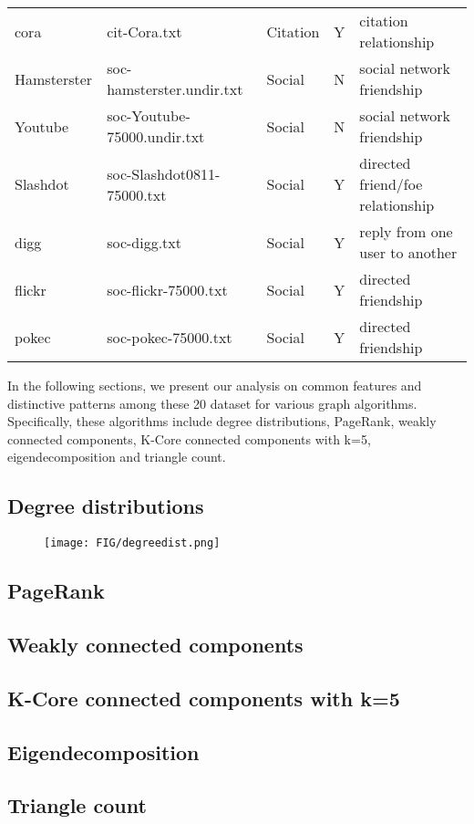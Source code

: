 \begin{table}[h]
\begin{tabular}{lllll}
cora           & cit-Cora.txt                 & Citation      & Y        & citation relationship                  \\
Hamsterster    & soc-hamsterster.undir.txt    & Social        & N        & social network friendship              \\
Youtube        & soc-Youtube-75000.undir.txt  & Social        & N        & social network friendship              \\
Slashdot       & soc-Slashdot0811-75000.txt   & Social        & Y        & directed friend/foe relationship       \\
digg           & soc-digg.txt                 & Social        & Y        & reply from one user to another         \\
flickr         & soc-flickr-75000.txt         & Social        & Y        & directed friendship                    \\
pokec          & soc-pokec-75000.txt          & Social        & Y        & directed friendship                                       \\ \hline
\end{tabular}
\end{table}

In the following sections, we present our analysis on common features and distinctive patterns among these 20 dataset for various graph algorithms. Specifically, these algorithms include degree distributions, PageRank, weakly connected components, K-Core connected components with k=5, eigendecomposition and triangle count.

\subsection{Degree distributions}
\begin{figure}[H]
\begin{center}
\texttt{[image: FIG/degreedist.png]} 
\end{center}
\end{figure}
\subsection{PageRank}
\subsection{Weakly connected components}
\subsection{K-Core connected components with k=5}
\subsection{Eigendecomposition}
\subsection{Triangle count}